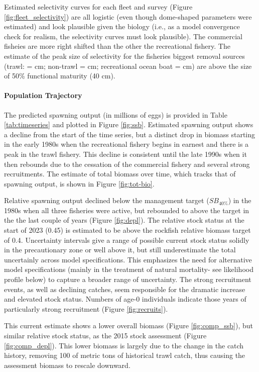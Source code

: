 \documentclass[11pt,
  english,
  letterpaper,
]{article}
\begin{document}
Estimated selectivity curves for each fleet and survey (Figure \ref{fig:fleet_selectivity}) are all logistic (even though dome-shaped parameters were estimated) and look plausible given the biology (i.e., as a model convergence check for realism, the selectivity curves must look plausible). The commercial fisheies are more right shifted than the other the recreational fishery. The estimate of the peak size of selectivity for the fisheries biggest removal sources (trawl: = cm; non-trawl = cm; recreational ocean boat = cm) are above the size of 50\% functional maturity (40 cm).

\hypertarget{population-trajectory}{%
\paragraph{Population Trajectory}\label{population-trajectory}}

The predicted spawning output (in millions of eggs) is provided in Table \ref{tab:timeseries} and plotted in Figure \ref{fig:ssb}. Estimated spawning output shows a decline from the start of the time series, but a distinct drop in biomass starting in the early 1980s when the recreational fishery begins in earnest and there is a peak in the trawl fishery. This decline is consistent until the late 1990s when it then rebounds due to the cessation of the commercial fishery and several strong recruitments. The estimate of total biomass over time, which tracks that of spawning output, is shown in Figure \ref{fig:tot-bio}.

Relative spawning output declined below the management target (\(SB_{40\%}\)) in the 1980s when all three fisheries were active, but rebounded to above the target in the the last couple of years (Figure \ref{fig:depl}). The relative stock status at the start of 2023 (0.45) is estimated to be above the rockfish relative biomass target of 0.4. Uncertainty intervals give a range of possible current stock status solidly in the precautionary zone or well above it, but still underestimate the total uncertainly across model specifications. This emphasizes the need for alternative model specifications (mainly in the treatment of natural mortality- see likelihood profile below) to capture a broader range of uncertainty. The strong recruitment events, as well as declining catches, seem responsible for the dramatic increase and elevated stock status. Numbers of age-0 individuals indicate those years of particularly strong recruitment (Figure \ref{fig:recruits}).

This current estimate shows a lower overall biomass (Figure \ref{fig:comp_ssb}), but similar relative stock status, as the 2015 stock assessment (Figure \ref{fig:comp_depl}). This lower biomass is largely due to the change in the catch history, removing 100 of metric tons of historical trawl catch, thus causing the assessment biomass to rescale downward.
\end{document}
